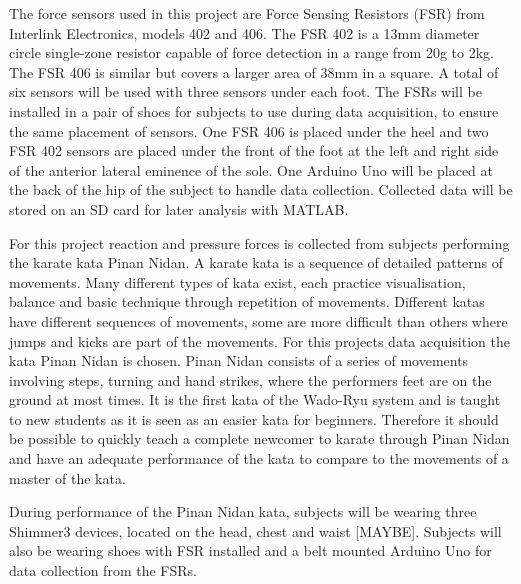 The force sensors used in this project are Force Sensing Resistors (FSR) from Interlink Electronics, models 402 and 406. The FSR 402 is a 13mm diameter circle single-zone resistor capable of force detection in a range from 20g to 2kg. The FSR 406 is similar but covers a larger area of 38mm in a square. \cite{IE400}
A total of six sensors will be used with three sensors under each foot. The FSRs will be installed in a pair of shoes for subjects to use during data acquisition, to ensure the same placement of sensors. One FSR 406 is placed under the heel and two FSR 402 sensors are placed under the front of the foot at the left and right side of the anterior lateral eminence of the sole. One Arduino Uno will be placed at the back of the hip of the subject to handle data collection. Collected data will be stored on an SD card for later analysis with MATLAB. 


For this project reaction and pressure forces is collected from subjects performing the karate kata Pinan Nidan. %
A karate kata is a sequence of detailed patterns of movements. Many different types of kata exist, each practice visualisation, balance and basic technique through repetition of movements. Different katas have different sequences of movements, some are more difficult than others where jumps and kicks are part of the movements. For this projects data acquisition the kata Pinan Nidan is chosen. Pinan Nidan consists of a series of movements involving steps, turning and hand strikes, where the performers feet are on the ground at most times. It is the first kata of the Wado-Ryu system and is taught to new students as it is seen as an easier kata for beginners. \cite{Mccarthy1987} Therefore it should be possible to quickly teach a complete newcomer to karate through Pinan Nidan and have an adequate performance of the kata to compare to the movements of a master of the kata. 

During performance of the Pinan Nidan kata, subjects will be wearing three Shimmer3 devices, located on the head, chest and waist [MAYBE]. Subjects will also be wearing shoes with FSR installed and a belt mounted Arduino Uno for data collection from the FSRs. 
